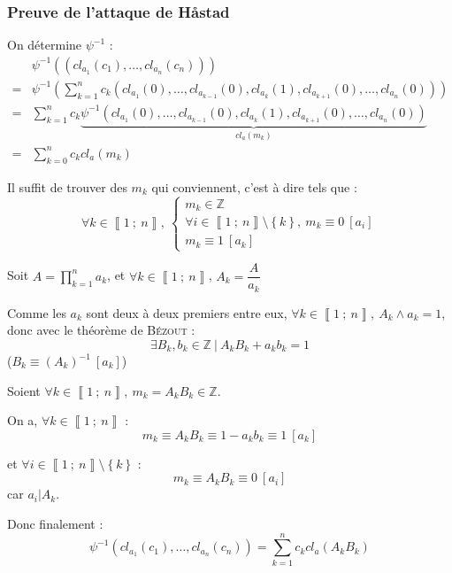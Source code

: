 \documentclass{beamer}
\newcommand{\Z}{\mathbb{Z}} %
\newcommand{\nset}[2]{\left\llbracket #1\ ;\ #2 \right\rrbracket}
\newcommand{\lr}[1]{\left( #1 \right)}
\newcommand{\set}[1]{\left\{ #1 \right\}}
\begin{document}
    \begin{frame}[allowframebreaks]
        \frametitle{Preuve de l'attaque de Håstad}

        On détermine $\psi^{-1}$ :
        \[
            \begin{array}{cl}
                & \psi^{-1}((cl_{a_1}(c_1), \ldots, cl_{a_n}(c_n)))
                \\
                =& \displaystyle
                \psi^{-1}\!\lr{\sum_{k = 1}^n c_k \lr{cl_{a_1}(0), \ldots, cl_{a_{k - 1}}(0), cl_{a_k}(1), cl_{a_{k + 1}}(0), \ldots, cl_{a_n}(0)}}
                \\
                =& \displaystyle
                \sum_{k = 1}^n c_k \underbrace{\psi^{-1} \lr{cl_{a_1}(0), \ldots, cl_{a_{k - 1}}(0), cl_{a_k}(1), cl_{a_{k + 1}}(0), \ldots, cl_{a_n}(0)}}_{cl_a(m_k)}
                \\
                =& \displaystyle \sum_{k = 0}^n c_k cl_a(m_k)
            \end{array}
        \]
    
        Il suffit de trouver des $m_k$ qui conviennent, c'est à dire tels que :
        \[
            \forall k \in \nset 1 n,\
            \begin{cases}
                m_k \in \Z
                \\
                \forall i \in \nset 1 n \setminus \set k,\
                m_k \equiv 0\ [a_i]
                \\
                m_k \equiv 1\ [a_k]
            \end{cases}
        \]
    
        Soit $A = \displaystyle \prod_{k = 1}^n a_k$, et $\forall k \in \nset 1 n$, $A_k = \dfrac{A}{a_k}$
    
        Comme les $a_k$ sont deux à deux premiers entre eux, $\forall k \in \nset 1 n,\ A_k \wedge a_k = 1$, donc avec le théorème de \textsc{Bézout} :
        \[
            \exists B_k, b_k \in \Z\ |\
            A_k B_k + a_k b_k = 1
        \]
        ($B_k \equiv \lr{A_k}^{-1}\ [a_k]$)
    
        \vspace{6pt}
    
        Soient $\forall k \in \nset 1 n,\ m_k = A_k B_k \in \Z$.
    
        \vspace{6pt}
    
        On a, $\forall k \in \nset 1 n$ :
        \[
            m_k \equiv A_k B_k \equiv 1 - a_k b_k \equiv 1\ [a_k]
        \]
    
        et $\forall i \in \nset 1 n \setminus \set k$ :
        \[
            m_k \equiv A_k B_k \equiv 0\ [a_i]
        \]
        car $a_i | A_k$.
    
        \vspace{12pt}
    
        Donc finalement :
        \[
            \psi^{-1}\lr{cl_{a_1}(c_1), \ldots, cl_{a_n}(c_n)}
            =
            \sum_{k = 1}^n c_k cl_a(A_k B_k)
        \]
    \end{frame}
\end{document}
